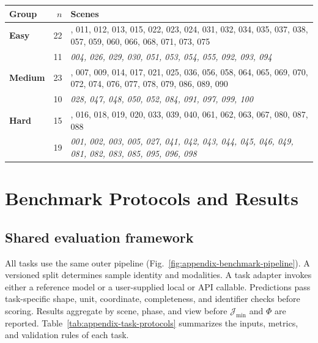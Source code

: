 \par\medskip\noindent\begin{minipage}{\columnwidth}
\centering
{}
\label{tab:appendix-tier-membership}
\footnotesize
\setlength{\tabcolsep}{3pt}
\begin{tabularx}{\columnwidth}{@{}l r >{\raggedright\arraybackslash}X@{}}
\toprule
Group & $n$ & Scenes \\
\midrule
\textcolor{tierE}{\textbf{Easy}} & 22 & 008, 011, 012, 013, 015, 022, 023, 024, 031, 032, 034, 035, 037, 038, 057, 059, 060, 066, 068, 071, 073, 075 \\
 & 11 & \textit{004, 026, 029, 030, 051, 053, 054, 055, 092, 093, 094} \\
\addlinespace[2pt]
\textcolor{tierM}{\textbf{Medium}} & 23 & 006, 007, 009, 014, 017, 021, 025, 036, 056, 058, 064, 065, 069, 070, 072, 074, 076, 077, 078, 079, 086, 089, 090 \\
 & 10 & \textit{028, 047, 048, 050, 052, 084, 091, 097, 099, 100} \\
\addlinespace[2pt]
\textcolor{tierH}{\textbf{Hard}} & 15 & 010, 016, 018, 019, 020, 033, 039, 040, 061, 062, 063, 067, 080, 087, 088 \\
 & 19 & \textit{001, 002, 003, 005, 027, 041, 042, 043, 044, 045, 046, 049, 081, 082, 083, 085, 095, 096, 098} \\
\bottomrule
\end{tabularx}
\end{minipage}\par\medskip


\section{Benchmark Protocols and Results}
\label{sec:appendix-protocols}


\subsection{Shared evaluation framework}

All tasks use the same outer pipeline (Fig.~\ref{fig:appendix-benchmark-pipeline}). A versioned split determines sample identity and modalities. A task adapter invokes either a reference model or a user-supplied local or API callable. Predictions pass task-specific shape, unit, coordinate, completeness, and identifier checks before scoring. Results aggregate by scene, phase, and view before $\mathcal J_{\min}$ and $\Phi$ are reported. Table~\ref{tab:appendix-task-protocols} summarizes the inputs, metrics, and validation rules of each task.

